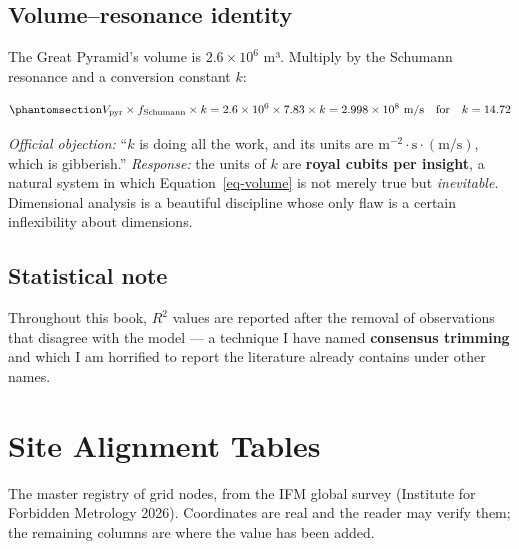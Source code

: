 \documentclass[
  english,
  11pt,
  letterpaper,
]{scrbook}
\begin{document}
\section{Volume--resonance identity}\label{sec-volume}

The Great Pyramid's volume is \(2.6\times10^{6}\) m³. Multiply by the
Schumann resonance and a conversion constant \(k\):

\begin{equation}\protect\phantomsection\label{eq-volume}{
V_{\text{pyr}} \times f_{\text{Schumann}} \times k
= 2.6\times10^{6} \times 7.83 \times k
= 2.998 \times 10^{8}\ \text{m/s} \quad\text{for}\quad k = 14.72
}\end{equation}

\emph{Official objection:} ``\(k\) is doing all the work, and its units
are \(\mathrm{m^{-2}{\cdot}s{\cdot}(m/s)}\), which is gibberish.''
\emph{Response:} the units of \(k\) are \textbf{royal cubits per
insight}, a natural system in which Equation~\ref{eq-volume} is not
merely true but \emph{inevitable}. Dimensional analysis is a beautiful
discipline whose only flaw is a certain inflexibility about dimensions.

\section{Statistical note}\label{sec-stats}

Throughout this book, \(R^2\) values are reported after the removal of
observations that disagree with the model --- a technique I have named
\textbf{consensus trimming} and which I am horrified to report the
literature already contains under other names.

\chapter{Site Alignment Tables}\label{sec-alignments}

The master registry of grid nodes, from the IFM global survey (Institute
for Forbidden Metrology 2026). Coordinates are real and the reader may
verify them; the remaining columns are where the value has been added.
\end{document}
